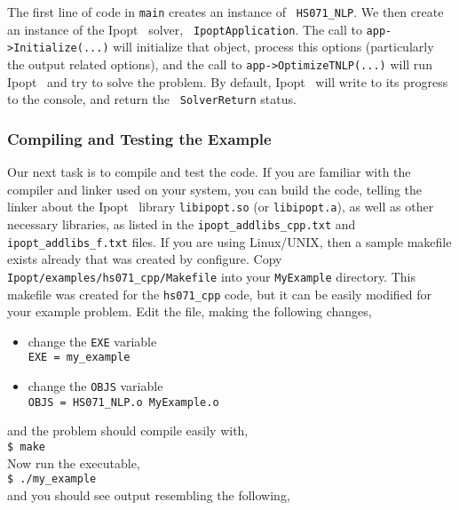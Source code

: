 \documentclass[10pt]{article}
\newcommand{\Ipopt}{{\sc Ipopt }}
\begin{document}
The first line of code in {\tt main} creates an instance of {\tt
  HS071\_NLP}. We then create an instance of the \Ipopt\ solver, {\tt
  IpoptApplication}. The call to {\tt app->Initialize(...)} will
initialize that object, process this options (particularly the output
related options), and the call to {\tt app->OptimizeTNLP(...)}  will
run \Ipopt\ and try to solve the problem. By default, \Ipopt\ will
write to its progress to the console, and return the {\tt
  SolverReturn} status.

\subsubsection{Compiling and Testing the Example}
Our next task is to compile and test the code. If you are familiar
with the compiler and linker used on your system, you can build the
code, telling the linker about the \Ipopt\ library {\tt libipopt.so}
(or {\tt libipopt.a}), as well as other necessary libraries, as listed
in the {\tt ipopt\_addlibs\_cpp.txt} and {\tt ipopt\_addlibs\_f.txt}
files.  If you are using Linux/UNIX, then a sample makefile exists
already that was created by configure.  Copy {\tt
  Ipopt/examples/hs071\_cpp/Makefile} into your {\tt MyExample}
directory.  This makefile was created for the {\tt hs071\_cpp} code,
but it can be easily modified for your example problem. Edit the file,
making the following changes,

\begin{itemize}
\item change the {\tt EXE} variable \\
{\tt EXE = my\_example}
\item change the {\tt OBJS} variable \\
{\tt OBJS = HS071\_NLP.o MyExample.o}
\end{itemize}
and the problem should compile easily with, \\
{\tt \$ make} \\
Now run the executable,\\ 
{\tt \$ ./my\_example} \\
and you should see output resembling the following,
\end{document}

